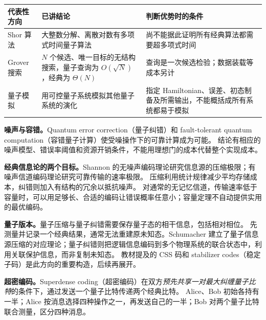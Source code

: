 \begin{center}
\begin{tabularx}{\textwidth}{@{}lXX@{}}
\toprule
代表性方向 & 已讲结论 & 判断优势时的条件 \\
\midrule
Shor 算法 & 大整数分解、离散对数有多项式时间量子算法 & 尚不能据此证明所有经典算法都需要超多项式时间 \\
Grover 搜索 & $N$ 个候选、唯一目标的无结构搜索，量子查询为 $O(\sqrt N)$，经典为 $\Theta(N)$ & 查询是一次候选检验；数据装载等成本另计 \\
量子模拟 & 用可控量子系统模拟其他量子系统的演化 & 指定 Hamiltonian、误差、初态制备及所需输出，不能概括成所有系统都易于模拟 \\
\bottomrule
\end{tabularx}
\end{center}

\textbf{噪声与容错。}Quantum error correction（量子纠错）和 fault-tolerant quantum computation（容错量子计算）使受噪操作下的可靠计算成为可能。
结论有相应的噪声模型、错误率阈值和资源开销条件，不能用理想门的成本代替整个实现成本。


\textbf{经典信息论的两个目标。}Shannon 的无噪声编码理论研究信息源的压缩极限；有噪声信道编码理论研究可靠传输的速率极限。
压缩利用统计规律减少平均存储成本，纠错则加入有结构的冗余以抵抗噪声。
对通常的无记忆信道，传输速率低于容量时，可以用足够长、合适的编码让错误概率任意小；容量定理不自动提供实用的最优编码。

\textbf{量子版本。}量子压缩与量子纠错需要保存量子态的相干信息，包括相对相位。
先测量并记录一个经典结果，通常无法重建原未知态。Schumacher 建立了量子信息源压缩的对应理论；量子纠错则把逻辑信息编码到多个物理系统的联合状态中，利用关联保护信息，而非复制未知态。
教材提及的 CSS 码和 stabilizer codes（稳定子码）是此方向的重要构造，后续再展开。

\textbf{超密编码。}Superdense coding（超密编码）在双方\emph{预先共享一对最大纠缠量子比特}的条件下，通过发送一个量子比特传递两个经典比特。
Alice、Bob 初始各持有一半；Alice 按消息选择四种操作之一，再发送自己的一半；Bob 对两个量子比特联合测量，区分四种消息。

